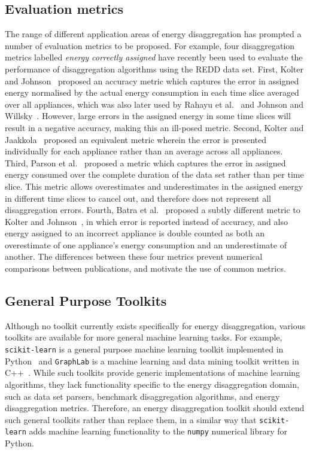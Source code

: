 \documentclass{sig-alternate}
\begin{document}
\subsection{Evaluation metrics}
\label{sec:evaluation_metrics}
\noindent The range of different application areas of energy disaggregation has prompted a number of evaluation metrics to be proposed. For example, four disaggregation metrics labelled \emph{energy correctly assigned} have recently been used to evaluate the performance of disaggregation algorithms using the REDD data set. First, Kolter and Johnson~\cite{redd} proposed an accuracy metric which captures the error in assigned energy normalised by the actual energy consumption in each time slice averaged over all appliances, which was also later used by Rahayu et al.~\cite{rahayu_2012} and Johnson and Willsky~\cite{johnson_2013}. However, large errors in the assigned energy in some time slices will result in a negative accuracy, making this an ill-posed metric. Second, Kolter and Jaakkola~\cite{kolter_2012} proposed an equivalent metric wherein the error is presented individually for each appliance rather than an average across all appliances. Third, Parson et al.~\cite{parson_2012} proposed a metric which captures the error in assigned energy consumed over the complete duration of the data set rather than per time slice. This metric allows overestimates and underestimates in the assigned energy in different time slices to cancel out, and therefore does not represent all disaggregation errors. Fourth, Batra et al.~\cite{batra_2013} proposed a subtly different metric to Kolter and Johnson~\cite{redd}, in which error is reported instead of accuracy, and also energy assigned to an incorrect appliance is double counted as both an overestimate of one appliance's energy consumption and an underestimate of another. The differences between these four metrics prevent numerical comparisons between publications, and motivate the use of common metrics.

\subsection{General Purpose Toolkits}
\label{sec:need_nilm_toolkit}
\noindent Although no toolkit currently exists specifically for energy disaggregation, various toolkits are available for more general machine learning tasks. For example, \texttt{scikit-learn} is a general purpose machine learning toolkit implemented in Python~\cite{scikit} and \texttt{GraphLab} is a machine learning and data mining toolkit written in C++~\cite{graphlab}. While such toolkits provide generic implementations of machine learning algorithms, they lack functionality specific to the energy disaggregation domain, such as data set parsers, benchmark disaggregation algorithms, and energy disaggregation metrics. Therefore, an energy disaggregation toolkit should extend such general toolkits rather than replace them, in a similar way that \texttt{scikit-learn} adds machine learning functionality to the \texttt{numpy} numerical library for Python. 
\end{document}
